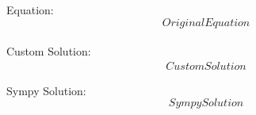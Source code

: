 \documentclass[12pt,fleqn]{article}
\begin{document}
Equation:\\
$$OriginalEquation$$
\\

Custom Solution:\\
\begin{multline}
CustomSolution
\end{multline}

Sympy Solution:\\
$$SympySolution$$
\\
\end{document}
